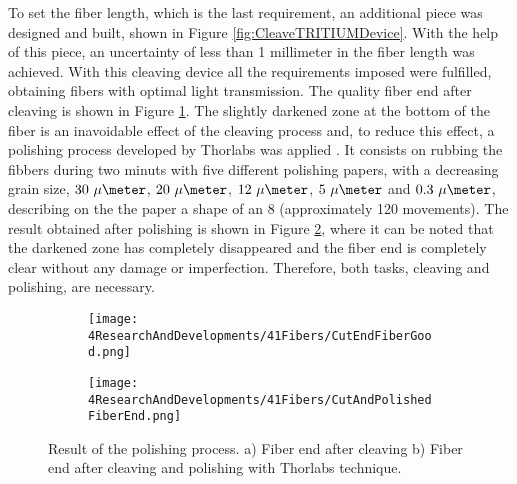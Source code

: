 To set the fiber length, which is the last requirement, an additional piece was designed and built, shown in Figure \ref{fig:CleaveTRITIUMDevice}. With the help of this piece, an uncertainty of less than 1 millimeter in the fiber length was achieved. With this cleaving device all the requirements imposed were fulfilled, obtaining fibers with optimal light transmission. The quality fiber end after cleaving is shown in Figure \ref{subfig:CleaveFiberEnd}. The slightly darkened zone at the bottom of the fiber is an inavoidable effect of the cleaving process and, to reduce this effect, a polishing process developed by Thorlabs was applied \cite{DiamondThorlabs}. It consists on rubbing the fibbers during two minuts with five different polishing papers, with a decreasing grain size, $30~\mu\meter$, $20~\mu\meter$, $12~\mu\meter$, $5~\mu\meter$ and $0.3~\mu\meter$, describing on the the paper a shape of an 8 (approximately 120 movements). The result obtained after polishing is shown in Figure \ref{subfig:PolishFiberEnd}, where it can be noted that the darkened zone has completely disappeared and the fiber end is completely clear without any damage or imperfection. Therefore, both tasks, cleaving and polishing,  are necessary.

\begin{figure}
\centering
    \begin{subfigure}[b]{0.5\textwidth}
    \centering
    \texttt{[image: 4ResearchAndDevelopments/41Fibers/CutEndFiberGood.png]}  
    \caption{\label{subfig:CleaveFiberEnd}}
    \end{subfigure}
    \hfill
    \begin{subfigure}[b]{0.45\textwidth}
    \centering
    \texttt{[image: 4ResearchAndDevelopments/41Fibers/CutAndPolishedFiberEnd.png]}  
    \caption{\label{subfig:PolishFiberEnd}}
    \end{subfigure}
 \caption{Result of the polishing process. a) Fiber end after cleaving b) Fiber end after cleaving and polishing with Thorlabs technique.}
 \label{fig:ResultofPolishingProcess}
\end{figure}